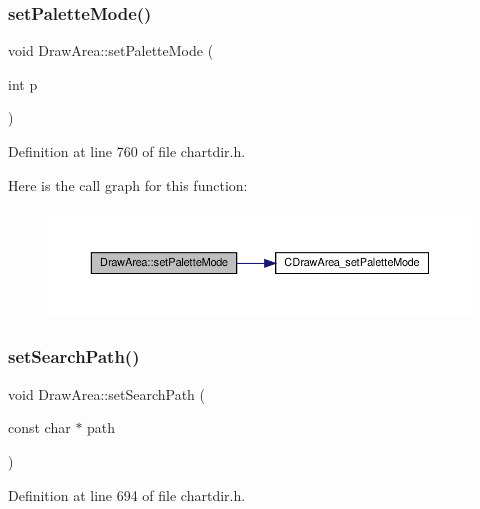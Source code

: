 \subsubsection{\texorpdfstring{set\+Palette\+Mode()}{setPaletteMode()}}
{\footnotesize\ttfamily void Draw\+Area\+::set\+Palette\+Mode (\begin{DoxyParamCaption}\item[{int}]{p }\end{DoxyParamCaption})\hspace{0.3cm}{\ttfamily [inline]}}



Definition at line 760 of file chartdir.\+h.

Here is the call graph for this function\+:
\nopagebreak
\begin{figure}[H]
\begin{center}
\leavevmode
\includegraphics[width=350pt]{class_draw_area_a967013dbd39a05ea06ae46ef3957fb46_cgraph}
\end{center}
\end{figure}
\mbox{\label{class_draw_area_ac5eedef9ea6349bdd1d495a7b59cb104}} 
\subsubsection{\texorpdfstring{set\+Search\+Path()}{setSearchPath()}}
{\footnotesize\ttfamily void Draw\+Area\+::set\+Search\+Path (\begin{DoxyParamCaption}\item[{const char $\ast$}]{path }\end{DoxyParamCaption})\hspace{0.3cm}{\ttfamily [inline]}}



Definition at line 694 of file chartdir.\+h.


